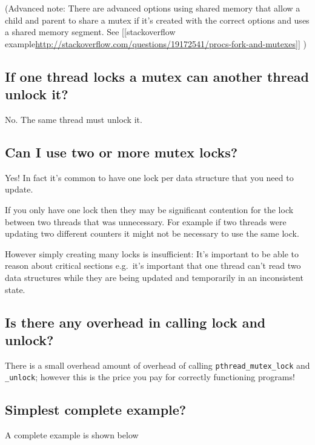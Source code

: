(Advanced note: There are advanced options using shared memory that
allow a child and parent to share a mutex if it's created with the
correct options and uses a shared memory segment. See
{[}{[}stackoverflow
example\textbar{}\url{http://stackoverflow.com/questions/19172541/procs-fork-and-mutexes}{]}{]}
)

\subsection{If one thread locks a mutex can another thread unlock
it?}\label{if-one-thread-locks-a-mutex-can-another-thread-unlock-it}

No. The same thread must unlock it.

\subsection{Can I use two or more mutex
locks?}\label{can-i-use-two-or-more-mutex-locks}

Yes! In fact it's common to have one lock per data structure that you
need to update.

If you only have one lock then they may be significant contention for
the lock between two threads that was unnecessary. For example if two
threads were updating two different counters it might not be necessary
to use the same lock.

However simply creating many locks is insufficient: It's important to be
able to reason about critical sections e.g.~it's important that one
thread can't read two data structures while they are being updated and
temporarily in an inconsistent state.

\subsection{Is there any overhead in calling lock and
unlock?}\label{is-there-any-overhead-in-calling-lock-and-unlock}

There is a small overhead amount of overhead of calling
\texttt{pthread\_mutex\_lock} and \texttt{\_unlock}; however this is the
price you pay for correctly functioning programs!

\subsection{Simplest complete example?}\label{simplest-complete-example}

A complete example is shown below

